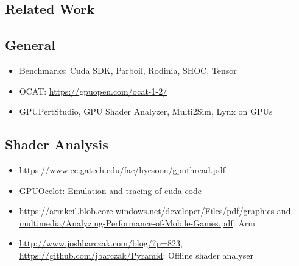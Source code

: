 \clearpage
{}
\label{sec:discussion}

\subsection{Related Work}
\label{sub:relatedwork}

\subsection{General}
\begin{itemize}
	\item Benchmarks: Cuda SDK, Parboil, Rodinia, SHOC, Tensor
	\item OCAT: \url{https://gpuopen.com/ocat-1-2/}
	\item GPUPertStudio, GPU Shader Analyzer, Multi2Sim, Lynx on GPUs
\end{itemize}

\subsection{Shader Analysis}
\begin{sloppypar}
	\begin{itemize}
		\item \url{https://www.cc.gatech.edu/fac/hyesoon/gputhread.pdf}
		\item GPUOcelot: Emulation and tracing of cuda code
		\item \url{https://armkeil.blob.core.windows.net/developer/Files/pdf/graphics-and-multimedia/Analyzing-Performance-of-Mobile-Games.pdf}: Arm
		\item \url{http://www.joshbarczak.com/blog/?p=823}, \url{https://github.com/jbarczak/Pyramid}: Offline shader analyser
	\end{itemize}
\end{sloppypar}

